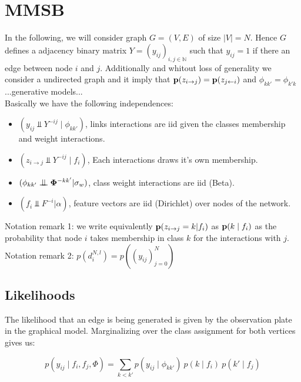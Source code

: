 \documentclass[a4paper, 12pt]{article}
\begin{document}
\section{MMSB}
In the following, we will consider graph $G=(V,E)$ of size $|V|=N$. Hence $G$ defines a adjacency binary matrix $Y=(y_{ij})_{i,j \in \mathbb{N}}$ such that $y_{ij}=1$ if there an edge between node $i$ and $j$. Additionally and whitout loss of generality we consider a undirected graph and it imply that $\mathbf{p}(z_{i\rightarrow j}) = \mathbf{p}(z_{j\leftarrow i})$ and $\phi_{kk'} = \phi_{k'k}$ \\

...generative models...\\

Basically we have the following independences:
\begin{itemize}
	\item $(y_{ij} \Perp Y^{-ij} \mid \phi_{kk'})$, links interactions are iid given the classes membership and weight interactions.
	\item $(z_{i\rightarrow j} \Perp Y^{-ij} \mid f_i)$,  Each interactions draws it's own membership.
    \item $(\phi_{kk'} \Perp \mat{\Phi}^{-kk'} | \sigma_w)$, class weight interactions are iid (Beta).
    \item $(f_i \Perp F^{-i} | \alpha)$, feature vectors are iid (Dirichlet) over nodes of the network.
\end{itemize}




Notation remark 1: 
we write equivalently  $\mathbf{p}(z_{i\rightarrow j}=k | f_i)$ as $\mathbf{p}(k \mid f_i)$ as the probability that node $i$ takes membership in class $k$ for the interactions with $j$. \\

Notation remark 2: $p(d_i^{N, l}) = p((y_{ij})_{j=0}^N )$


\subsection{Likelihoods}
The likelihood that an edge is being generated is given by the observation plate in the graphical model. Marginalizing over the class assignment for both vertices gives us:

\begin{equation} \label{eq:mmsb_like}
p(y_{ij} \mid f_i, f_j, \Phi) = \sum_{k<k'} p(y_{ij} \mid \phi_{kk'})\ p(k\mid f_i)\ p(k'\mid f_j)
\end{equation}
\end{document}
